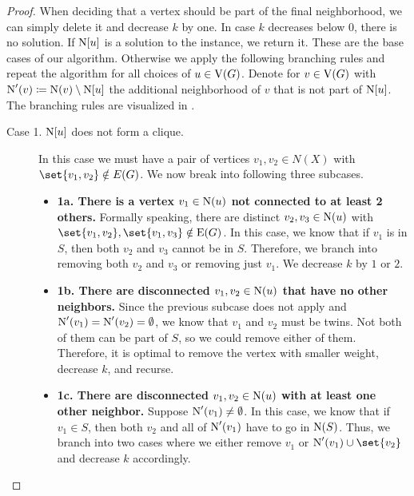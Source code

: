 \begin{lemma}
\begin{proof}
    When deciding that a vertex should be part of the final neighborhood, we can simply delete it and decrease $k$ by one. In case $k$ decreases below 0, there is no solution. If $\operatorname{N}[{u}]$ is a solution to the instance, we return it. These are the base cases of our algorithm. Otherwise we apply the following branching rules and repeat the algorithm for all choices of $u \in \operatorname{V}({G})$.
    Denote for $v \in \operatorname{V}({G})$ with $\operatorname{N}'(v) \coloneqq \operatorname{N}({v}) \setminus \operatorname{N}[{u}]$ the additional neighborhood of $v$ that is not part of $\operatorname{N}[{u}]$. 
    The branching rules are visualized in .
    
\begin{description}
    \item[Case 1. $\operatorname{N}[{u}]$ does not form a clique.] In this case we must have a pair of vertices  $v_1, v_2 \in N(X)$ with $\set{v_1, v_2}\notin E(G)$. We now break into following three subcases.
    
    \begin{itemize}
        \item\label{it:clique1} \textbf{1a. There is a vertex $v_1 \in \operatorname{N}({u})$ not connected to at least 2 others.} Formally speaking, there are distinct $v_2, v_3 \in \operatorname{N}({u})$ with $\set{v_1, v_2}, \set{v_1, v_3} \notin \e{G}$. In this case, we know that if $v_1$ is in $S$, then both $v_2$ and $v_3$ cannot be in $S$.
        Therefore, we branch into removing both $v_2$ and $v_3$ or removing just $v_1$. We decrease $k$ by $1$ or $2$.

        \item \label{it:clique2}\textbf{1b. There are disconnected $v_1, v_2 \in \operatorname{N}({u})$ that have no other neighbors.}
        Since the previous subcase does not apply and $\operatorname{N}'(v_1) = \operatorname{N}'(v_2) = \emptyset$, we know that $v_1$ and $v_2$ must be twins. Not both of them can be part of $S$, so we could remove either of them. Therefore, it is optimal to remove the vertex with smaller weight, decrease $k$, and recurse.
        
        \item \label{it:clique3}\textbf{1c. There are disconnected $v_1, v_2 \in \operatorname{N}({u})$ with at least one other neighbor.}
        Suppose $\operatorname{N}'(v_1) \ne \emptyset$. In this case, we know that if $v_1 \in S$, then both $v_2$ and all of $\operatorname{N}'(v_1)$ have to go in $\operatorname{N}({S})$.
        Thus, we branch into two cases where we either remove $v_1$ or $\neiOp'(v_1) \cup \set{v_2}$ and decrease $k$ accordingly.
    \end{itemize} \medskip 
    

\end{description}
\end{proof}
\end{lemma}
